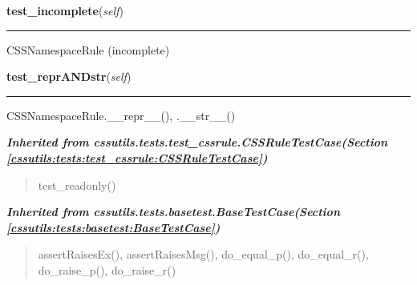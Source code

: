     \vspace{0.5ex}

\hspace{.8\funcindent}\begin{boxedminipage}{\funcwidth}

    \raggedright \textbf{test\_incomplete}(\textit{self})

    \vspace{-1.5ex}

    \rule{\textwidth}{0.5\fboxrule}
\setlength{\parskip}{2ex}
    CSSNamespaceRule (incomplete)

\setlength{\parskip}{1ex}
    \end{boxedminipage}

    \label{cssutils:tests:test_cssnamespacerule:CSSNamespaceRuleTestCase:test_reprANDstr}

    \vspace{0.5ex}

\hspace{.8\funcindent}\begin{boxedminipage}{\funcwidth}

    \raggedright \textbf{test\_reprANDstr}(\textit{self})

    \vspace{-1.5ex}

    \rule{\textwidth}{0.5\fboxrule}
\setlength{\parskip}{2ex}
    CSSNamespaceRule.\_\_repr\_\_(), .\_\_str\_\_()

\setlength{\parskip}{1ex}
    \end{boxedminipage}


\large{\textbf{\textit{Inherited from cssutils.tests.test\_cssrule.CSSRuleTestCase\textit{(Section \ref{cssutils:tests:test_cssrule:CSSRuleTestCase})}}}}

\begin{quote}
test\_readonly()
\end{quote}

\large{\textbf{\textit{Inherited from cssutils.tests.basetest.BaseTestCase\textit{(Section \ref{cssutils:tests:basetest:BaseTestCase})}}}}

\begin{quote}
assertRaisesEx(), assertRaisesMsg(), do\_equal\_p(), do\_equal\_r(), do\_raise\_p(), do\_raise\_r()
\end{quote}

